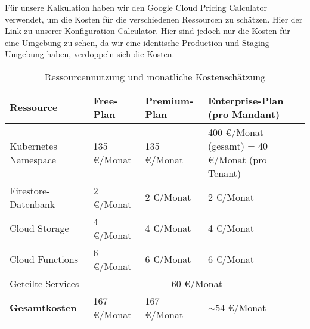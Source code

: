 Für unsere Kalkulation haben wir den Google Cloud Pricing Calculator verwendet, um die Kosten für die verschiedenen Ressourcen zu schätzen. Hier der Link zu unserer Konfiguration \href{https://cloud.google.com/products/calculator?hl=de&dl=CjhDaVExWXpBNE5UUm1OaTA0TUdKaUxUUTFPVFl0T0dGa09DMWxZVEEzTVdZeVlXSm1ZalVRQVE9PRAJGiQzREI3QkJCQS04Nzc0LTQ5RTEtODY5Qy1DQjVCREI5NzlGMDM}{Calculator}. Hier sind jedoch nur die Kosten für eine Umgebung zu sehen, da wir eine identische Production und Staging Umgebung haben, verdoppeln sich die Kosten.  \\

\begin{table}[h!]
	\centering
	\caption{Ressourcennutzung und monatliche Kostenschätzung}
	{
		\begin{tabularx}{\textwidth}{|l|X|X|X|}
			\hline
			\textbf{Ressource}    & \textbf{Free-Plan}              & \textbf{Premium-Plan} & \textbf{Enterprise-Plan (pro Mandant)} \\ \hline
			Kubernetes Namespace  & 135 €/Monat                     & 135 €/Monat           & 400 €/Monat (gesamt) = 40 €/Monat (pro Tenant)                          \\ \hline
			Firestore-Datenbank   & 2 €/Monat                       & 2 €/Monat             & 2 €/Monat                              \\ \hline
			Cloud Storage         & 4 €/Monat                       & 4 €/Monat             & 4 €/Monat                              \\ \hline
			Cloud Functions       & 6 €/Monat                       & 6 €/Monat             & 6 €/Monat                              \\ \hline
			Geteilte Services     & \multicolumn{3}{c|}{60 €/Monat}                                                                  \\ \hline
			\textbf{Gesamtkosten} & 167 €/Monat                     & 167 €/Monat           & $\sim 54$ €/Monat                      \\ \hline
		\end{tabularx}}
	\label{tab:costmodel}
\end{table}

